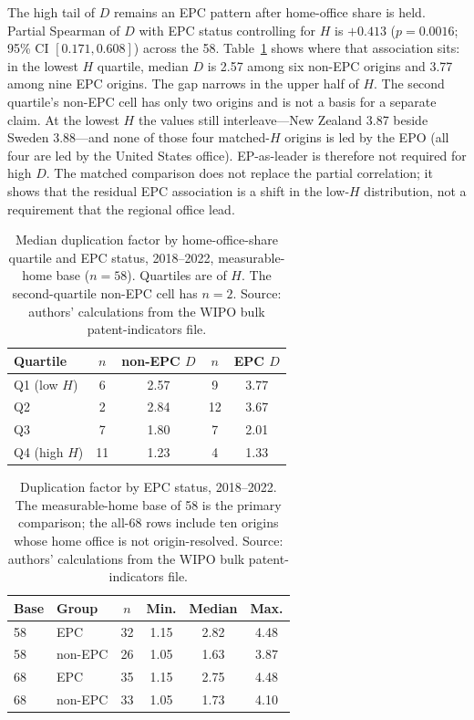 \documentclass[a4paper,fleqn]{cas-dc}
\begin{document}
The high tail of $D$ remains an EPC pattern after home-office share is held.
Partial Spearman of $D$ with EPC status controlling for $H$ is $+0.413$
($p=0.0016$; 95\% CI $[0.171, 0.608]$) across the 58. Table~\ref{tab:epcq}
shows where that association sits: in the lowest $H$ quartile, median $D$ is
2.57 among six non-EPC origins and 3.77 among nine EPC origins. The gap
narrows in the upper half of $H$. The second quartile's non-EPC cell has only
two origins and is not a basis for a separate claim. At the lowest $H$ the
values still interleave---New Zealand 3.87 beside Sweden 3.88---and none of
those four matched-$H$ origins is led by the EPO (all four are led by the
United States office). EP-as-leader is therefore not required for high $D$.
The matched comparison does not replace the partial correlation; it shows
that the residual EPC association is a shift in the low-$H$ distribution, not
a requirement that the regional office lead.

\begin{table}[t]
\caption{Median duplication factor by home-office-share quartile and EPC
status, 2018--2022, measurable-home base ($n=58$). Quartiles are of $H$.
The second-quartile non-EPC cell has $n=2$. Source: authors' calculations
from the WIPO bulk patent-indicators file.}
\label{tab:epcq}
\centering
\small
\setlength{\tabcolsep}{4pt}
\begin{tabular}{@{}lcccc@{}}
\toprule
Quartile & $n$ & non-EPC $D$ & $n$ & EPC $D$ \\
\midrule
Q1 (low $H$) & 6 & 2.57 & 9 & 3.77 \\
Q2 & 2 & 2.84 & 12 & 3.67 \\
Q3 & 7 & 1.80 & 7 & 2.01 \\
Q4 (high $H$) & 11 & 1.23 & 4 & 1.33 \\
\bottomrule
\end{tabular}
\end{table}

\begin{table}[t]
\caption{Duplication factor by EPC status, 2018--2022. The measurable-home
base of 58 is the primary comparison; the all-68 rows include ten origins
whose home office is not origin-resolved. Source: authors' calculations from
the WIPO bulk patent-indicators file.}
\label{tab:epc}
\centering
\small
\begin{tabular}{@{}llcccc@{}}
\toprule
Base & Group & $n$ & Min. & Median & Max. \\
\midrule
58 & EPC & 32 & 1.15 & 2.82 & 4.48 \\
58 & non-EPC & 26 & 1.05 & 1.63 & 3.87 \\
68 & EPC & 35 & 1.15 & 2.75 & 4.48 \\
68 & non-EPC & 33 & 1.05 & 1.73 & 4.10 \\
\bottomrule
\end{tabular}
\end{table}
\end{document}
